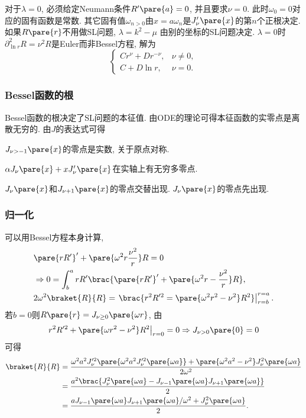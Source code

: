 \documentclass[hidelinks]{ctexart}
\begin{document}
\newpoint{}对于$\lambda = 0$, 必须给定Neumann条件$R'\pare{a} = 0$, 并且要求$\nu = 0$. 此时$\omega_0 = 0$对应的固有函数是常数.
\newpoint{}其它固有值$\omega_{n>0}$由$x = a\omega_n$是$J'_\nu\pare{x}$的第$n$个正根决定.
\newpoint{}如果$R\pare{r}$不用做SL问题, $\lambda = k^2 - \mu$ 由别的坐标的SL问题决定. $\lambda = 0$时$\partial_{\ln r}^2 R = \nu^2 R$是Euler而非Bessel方程, 解为
\[ \begin{cases}
    Cr^\nu + Dr^{-\nu}, & \nu \neq 0, \\
    C + D\ln r, & \nu = 0.
\end{cases} \]


\subsubsection{Bessel函数的根} %
\label{ssub:bessel函数的根}

\newpoint{}Bessel函数的根决定了SL问题的本征值.
\newpoint{}由ODE的理论可得本征函数的实零点是离散无穷的.
\newpoint{}由$J$的表达式可得
\begin{cenum}
    \item $J_{\nu > -1}\pare{x}$的零点是实数, 关于原点对称.
    \item $\alpha J_\nu\pare{x} + xJ'_\nu\pare{x}$在实轴上有无穷多零点.
    \item $J_\nu\pare{x}$和$J_{\nu+1}\pare{x}$的零点交替出现. $J_\nu\pare{x}$的零点先出现.
\end{cenum}


\subsubsection{归一化} %
\label{ssub:归一化}

\newpoint{}可以用Bessel方程本身计算,
\begin{align*}
    & \pare{rR'}' + \pare{\omega^2 r \frac{\nu^2}{r}}R = 0 \\
    & \Rightarrow 0 = \int_b^a rR'\brac{\pare{rR'}' + \pare{\omega^2 r - \frac{\nu^2}{r}}R}, \\
    & 2\omega^2 \braket{R}{R} = \left.\brac{r^2R'^2 = \pare{\omega^2 r^2 - \nu^2}R^2}\right\vert_{r=b}^{r=a}.
\end{align*}
若$b=0$则$R\pare{r} = J_{\nu\ge 0}\pare{\omega r}$, 由
\[ \left.r^2 R'^2 + \pare{\omega r^2 - \nu^2}R^2\right\vert_{r=0} = 0 \Rightarrow J_{\nu>0}\pare{0} = 0 \]
可得
\begin{align*}
    \braket{R}{R} &= \frac{\omega^2 a^2 J'^2_\nu\pare{\omega^2 a^2 J'^2_\nu\pare{\omega a}} + \pare{\omega^2 a^2 - \nu^2}J_\nu^2\pare{\omega a}}{2\omega^2} \\
    &= \frac{a^2\brac{J_\nu^2\pare{\omega a} - J_{\nu - 1}\pare{\omega a}J_{\nu+1}\pare{\omega a}}}{2} \\
    &= \frac{aJ_{\nu - 1}\pare{\omega a}J_{\nu + 1}\pare{\omega a}/\omega^2 + J_\nu^2 \pare{\omega a}}{2}.
\end{align*}
\end{document}
